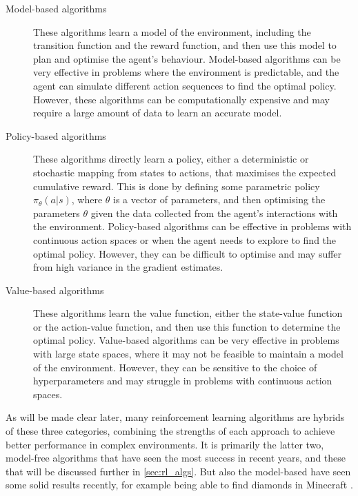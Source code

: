 \begin{description}
    \item[Model-based algorithms]
        These algorithms learn a model of the environment, including the transition function and the reward function, and then use this model to plan and optimise the agent's behaviour.
        Model-based algorithms can be very effective in problems where the environment is predictable, and the agent can simulate different action sequences to find the optimal policy.
        However, these algorithms can be computationally expensive and may require a large amount of data to learn an accurate model.

    \item[Policy-based algorithms]
        These algorithms directly learn a policy, either a deterministic or stochastic mapping from states to actions, that maximises the expected cumulative reward.
        This is done by defining some parametric policy $\pi_\theta(a | s)$, where $\theta$ is a vector of parameters, and then optimising the parameters $\theta$ given the data collected from the agent's interactions with the environment.
        Policy-based algorithms can be effective in problems with continuous action spaces or when the agent needs to explore to find the optimal policy.
        However, they can be difficult to optimise and may suffer from high variance in the gradient estimates.

    \item[Value-based algorithms]
        These algorithms learn the value function, either the state-value function or the action-value function, and then use this function to determine the optimal policy.
        Value-based algorithms can be very effective in problems with large state spaces, where it may not be feasible to maintain a model of the environment.
        However, they can be sensitive to the choice of hyperparameters and may struggle in problems with continuous action spaces.
\end{description}

As will be made clear later, many reinforcement learning algorithms are hybrids of these three categories, combining the strengths of each approach to achieve better performance in complex environments.
It is primarily the latter two, model-free algorithms that have seen the most success in recent years, and these that will be discussed further in \cref{sec:rl_algs}.
But also the model-based have seen some solid results recently, for example being able to find diamonds in Minecraft \cite{hafner2023}.


